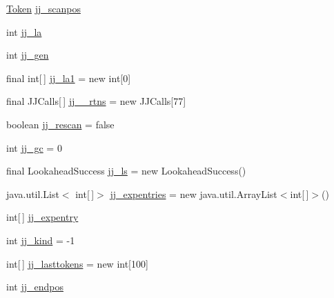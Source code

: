 \begin{DoxyCompactItemize}
\item 
\hyperlink{classde_1_1uulm_1_1ecs_1_1ai_1_1owlapi_1_1krssparser_1_1_token}{Token} \hyperlink{classde_1_1uulm_1_1ecs_1_1ai_1_1owlapi_1_1krssparser_1_1_k_r_s_s2_parser_a3593d1cbb6bf48838f1b97cf9a524b2a}{jj\-\_\-scanpos}
\item 
int \hyperlink{classde_1_1uulm_1_1ecs_1_1ai_1_1owlapi_1_1krssparser_1_1_k_r_s_s2_parser_a26f0c112d90cf3473b337928a8323e91}{jj\-\_\-la}
\item 
int \hyperlink{classde_1_1uulm_1_1ecs_1_1ai_1_1owlapi_1_1krssparser_1_1_k_r_s_s2_parser_a6cda16969a3346b2fe721513ffa07d0a}{jj\-\_\-gen}
\item 
final int\mbox{[}$\,$\mbox{]} \hyperlink{classde_1_1uulm_1_1ecs_1_1ai_1_1owlapi_1_1krssparser_1_1_k_r_s_s2_parser_a5527f74636000abeea68dea7447490f4}{jj\-\_\-la1} = new int\mbox{[}0\mbox{]}
\item 
final J\-J\-Calls\mbox{[}$\,$\mbox{]} \hyperlink{classde_1_1uulm_1_1ecs_1_1ai_1_1owlapi_1_1krssparser_1_1_k_r_s_s2_parser_aabb1e768c664366b5600668c2cddc7c0}{jj\-\_\-\_\-rtns} = new J\-J\-Calls\mbox{[}77\mbox{]}
\item 
boolean \hyperlink{classde_1_1uulm_1_1ecs_1_1ai_1_1owlapi_1_1krssparser_1_1_k_r_s_s2_parser_af6ab5db49b954a9ddfc4ed5d470010a8}{jj\-\_\-rescan} = false
\item 
int \hyperlink{classde_1_1uulm_1_1ecs_1_1ai_1_1owlapi_1_1krssparser_1_1_k_r_s_s2_parser_a5fe49012d47d2dfe753aed2c854528ae}{jj\-\_\-gc} = 0
\item 
final Lookahead\-Success \hyperlink{classde_1_1uulm_1_1ecs_1_1ai_1_1owlapi_1_1krssparser_1_1_k_r_s_s2_parser_a59e05be2bae132dcb26af73f1a1132be}{jj\-\_\-ls} = new Lookahead\-Success()
\item 
java.\-util.\-List$<$ int\mbox{[}$\,$\mbox{]}$>$ \hyperlink{classde_1_1uulm_1_1ecs_1_1ai_1_1owlapi_1_1krssparser_1_1_k_r_s_s2_parser_affda0c4a80a68d356f876d721bd7902f}{jj\-\_\-expentries} = new java.\-util.\-Array\-List$<$int\mbox{[}$\,$\mbox{]}$>$()
\item 
int\mbox{[}$\,$\mbox{]} \hyperlink{classde_1_1uulm_1_1ecs_1_1ai_1_1owlapi_1_1krssparser_1_1_k_r_s_s2_parser_a38afe425e24e5190984336ebb7e56b4d}{jj\-\_\-expentry}
\item 
int \hyperlink{classde_1_1uulm_1_1ecs_1_1ai_1_1owlapi_1_1krssparser_1_1_k_r_s_s2_parser_a9617ef36720fb7f00a424f612346231e}{jj\-\_\-kind} = -\/1
\item 
int\mbox{[}$\,$\mbox{]} \hyperlink{classde_1_1uulm_1_1ecs_1_1ai_1_1owlapi_1_1krssparser_1_1_k_r_s_s2_parser_aa760badd906e78575123982a8237d75f}{jj\-\_\-lasttokens} = new int\mbox{[}100\mbox{]}
\item 
int \hyperlink{classde_1_1uulm_1_1ecs_1_1ai_1_1owlapi_1_1krssparser_1_1_k_r_s_s2_parser_af3dbd52476be67b759a51782aac49501}{jj\-\_\-endpos}
\end{DoxyCompactItemize}
